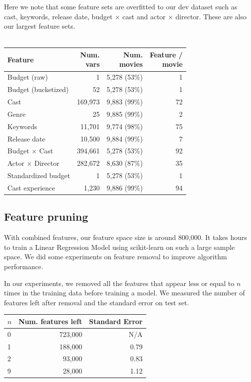 \documentclass[journal]{IEEEtran}
\begin{document}
\par Here we note that some feature sets are overfitted to our dev dataset such as
cast, keywords, release date, budget $\times$ cast and actor $\times$ director.
These are also our largest feature sets.\\
\\
\begin{tabular}{|l| r r r|} %
\hline
Feature             & \shortstack[c]{Num.\\vars} & \shortstack[c]{Num.\\movies} & \shortstack[c]{Feature / \\ movie}  \\ [0.5ex] %
\hline
Budget (raw)        & 1 & 5,278 (53\%) & 1 \\ %
Budget (bucketized) & 52 & 5,278 (53\%) & 1 \\
Cast                & 169,973 & 9,883 (99\%) & 72 \\
Genre               & 25 & 9,885 (99\%) & 2 \\
Keywords            & 11,701 & 9,774 (98\%) & 75 \\
Release date        & 10,500 & 9,884 (99\%) & 7 \\
\hline
Budget $\times$ Cast & 394,661 & 5,278 (53\%) & 92 \\
Actor $\times$ Director & 282,672 & 8,630 (87\%) & 35 \\
\hline
Standardized budget & 1 & 5,278 (53\%) & 1 \\
Cast experience & 1,230 & 9,886 (99\%) & 94 \\
\hline %
\end{tabular}

\subsection{Feature pruning}
With combined features, our feature space size is around 800,000. It takes hours to train a Linear Regression Model using scikit-learn \cite{scikit} on such a large sample space. We did some experiments on feature removal to improve algorithm performance.
\\
\par In our experiments, we removed all the features that appear less or equal to $n$ times in the training data before training a model. We measured the number of features left after removal and the standard error on test set.\\
\begin{center}
\begin{tabular}{|l| r r|} %
\hline
$n$ & Num. features left & Standard Error  \\ [0.5ex] %
\hline
0 & 723,000 & N/A \\
1 & 188,000 & 0.79 \\
2 & 93,000  & 0.83 \\
9 & 28,000  & 1.12 \\
\hline %
\end{tabular}
\end{center}
\smallskip
\end{document}
